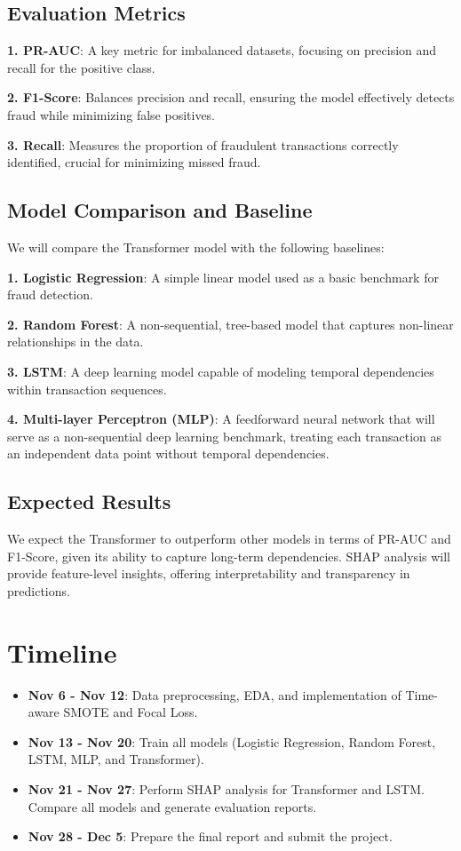 \documentclass[11pt, oneside]{article}   	%
\begin{document}
\subsection{Evaluation Metrics}
\textbf{1. PR-AUC}: A key metric for imbalanced datasets, focusing on precision and recall for the positive class.

\textbf{2. F1-Score}: Balances precision and recall, ensuring the model effectively detects fraud while minimizing false positives.

\textbf{3. Recall}: Measures the proportion of fraudulent transactions correctly identified, crucial for minimizing missed fraud.

\subsection{Model Comparison and Baseline}

We will compare the Transformer model with the following baselines:

\textbf{1. Logistic Regression}: A simple linear model used as a basic benchmark for fraud detection.

\textbf{2. Random Forest}: A non-sequential, tree-based model that captures non-linear relationships in the data.

\textbf{3. LSTM}: A deep learning model capable of modeling temporal dependencies within transaction sequences.

\textbf{4. Multi-layer Perceptron (MLP)}: A feedforward neural network that will serve as a non-sequential deep learning benchmark, treating each transaction as an independent data point without temporal dependencies.

\subsection{Expected Results}

We expect the Transformer to outperform other models in terms of PR-AUC and F1-Score, given its ability to capture long-term dependencies. SHAP analysis will provide feature-level insights, offering interpretability and transparency in predictions.


\section{Timeline}

\begin{itemize}
    \item \textbf{Nov 6 - Nov 12}: Data preprocessing, EDA, and implementation of Time-aware SMOTE and Focal Loss.
    \item \textbf{Nov 13 - Nov 20}: Train all models (Logistic Regression, Random Forest, LSTM, MLP, and Transformer).
    \item \textbf{Nov 21 - Nov 27}: Perform SHAP analysis for Transformer and LSTM. Compare all models and generate evaluation reports.
    \item \textbf{Nov 28 - Dec 5}: Prepare the final report and submit the project.
\end{itemize}
\end{document}
